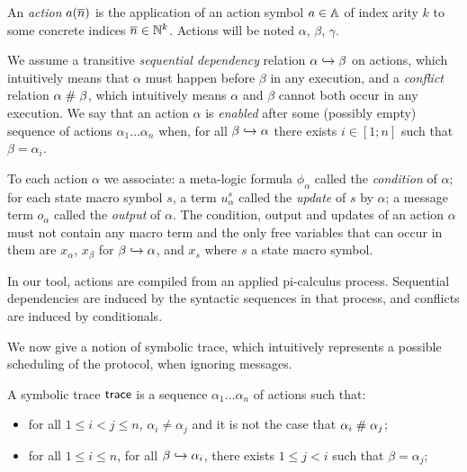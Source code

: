 \begin{definition}
  An \emph{action} $a(\overline{n})$ is the application of
  an action symbol $a\in\mathbb{A}$ of index arity $k$ to
  some concrete indices $\overline{n}\in\mathbb{N}^k$.
  Actions will be noted $\alpha$, $\beta$, $\gamma$.

  We assume a transitive \emph{sequential dependency} relation
  $\alpha\hookrightarrow\beta$ on actions, which intuitively means that
  $\alpha$ must happen before $\beta$ in any execution,
  and a \emph{conflict} relation $\alpha\mathrel{\#}\beta$, 
  which intuitively means $\alpha$ and $\beta$ cannot both occur in
  any execution.
  We say that an action $\alpha$ is \emph{enabled} after some (possibly empty)
  sequence of actions $\alpha_1\ldots\alpha_n$ when, for all 
  $\beta\hookrightarrow\alpha$ there exists $i\in[1;n]$ such that $\beta=\alpha_i$.

  To each action $\alpha$ we associate:
  a meta-logic formula $\phi_\alpha$ called the \emph{condition}
  of $\alpha$;
  for each state macro symbol $s$, a term $u^s_\alpha$ called
  the \emph{update} of $s$ by $\alpha$;
  a message term $o_\alpha$ called the \emph{output} of $\alpha$.
  The condition, output and updates of an action $\alpha$ must not contain any
  macro term and the only free variables that can occur in them are
  $x_\alpha$, $x_\beta$ for $\beta\hookrightarrow\alpha$, and $x_s$ where $s$ a
  state macro symbol.
\end{definition}

In our tool, actions are compiled from an applied pi-calculus process.
Sequential dependencies are induced by the syntactic sequences in that 
process, and conflicts are induced by conditionals.

\medskip

We now give a notion of symbolic trace, which intuitively represents
a possible scheduling of the protocol, when ignoring messages.

\begin{definition}
  A symbolic trace $\textsf{trace}$ is a sequence $\alpha_1\ldots\alpha_n$ of actions
  such that:
  \begin{itemize}
    \item for all $1 \leq i < j \leq n$,
      $\alpha_i \neq \alpha_j$ and it is not the case
      that $\alpha_i \mathrel{\#} \alpha_j$;
    \item for all $1 \leq i \leq n$,
      for all $\beta \hookrightarrow \alpha_i$,
      there exists $1 \leq j < i$ such that $\beta = \alpha_j$;
  \end{itemize}
\end{definition}

